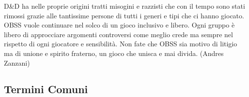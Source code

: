 \vfill

\begin{enfasi}
D\&D ha nelle proprie origini tratti misogini e razzisti che con il tempo sono stati rimossi grazie alle tantissime persone di tutti i generi e tipi che ci hanno giocato.
OBSS vuole continuare nel solco di un gioco inclusivo e libero. Ogni gruppo è libero di approcciare argomenti controversi come meglio crede ma sempre nel rispetto di ogni giocatore e sensibilità. Non fate che OBSS sia motivo di litigio ma di unione e spirito fraterno, un gioco che unisca e mai divida. (Andres Zanzani)
\end{enfasi}

\pagebreak

\subsection{Termini Comuni}\label{termini-comuni}

